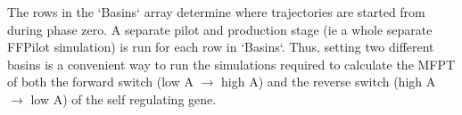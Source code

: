 The rows in the `Basins` array determine where trajectories are started from during phase zero. A separate pilot and production stage (ie a whole separate FFPilot simulation) is run for each row in `Basins`. Thus, setting two different basins is a convenient way to run the simulations required to calculate the MFPT of both the forward switch (low A $\rightarrow$ high A) and the reverse switch (high A $\rightarrow$ low A) of the self regulating gene.
